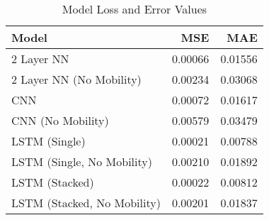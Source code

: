 ﻿\documentclass{article}
\begin{document}
  \begin{table}[h!]
  \begin{centering}
  \begin{tabular}{l | r | r }
    
    Model & MSE & MAE \\
    \hline
    2 Layer NN & 0.00066 & 0.01556 \\
    2 Layer NN (No Mobility) & 0.00234 & 0.03068 \\
    CNN & 0.00072 & 0.01617 \\
    CNN (No Mobility) & 0.00579 & 0.03479 \\
    LSTM (Single) & 0.00021 & 0.00788 \\
    LSTM (Single, No Mobility) & 0.00210 & 0.01892 \\
    LSTM (Stacked) & 0.00022 & 0.00812 \\
    LSTM (Stacked, No Mobility) & 0.00201 & 0.01837 \\
                               
  \end{tabular}
  \caption{Model Loss and Error Values}
  \label{table:1}
  \end{centering}
\end{table}
\end{document}
